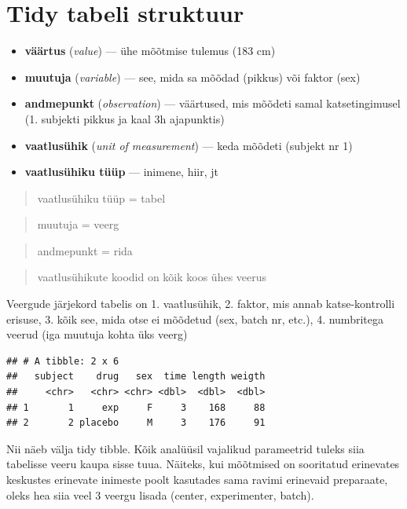 \documentclass[]{book}
\providecommand{\tightlist}{%
  \setlength{\itemsep}{0pt}\setlength{\parskip}{0pt}}
\begin{document}
\section{Tidy tabeli struktuur}\label{tidy-tabeli-struktuur}

\begin{itemize}
\tightlist
\item
  \textbf{väärtus} (\emph{value}) --- ühe mõõtmise tulemus (183 cm)
\item
  \textbf{muutuja} (\emph{variable}) --- see, mida sa mõõdad (pikkus)
  või faktor (sex)
\item
  \textbf{andmepunkt} (\emph{observation}) --- väärtused, mis mõõdeti
  samal katsetingimusel (1. subjekti pikkus ja kaal 3h ajapunktis)
\item
  \textbf{vaatlusühik} (\emph{unit of measurement}) --- keda mõõdeti
  (subjekt nr 1)
\item
  \textbf{vaatlusühiku tüüp} --- inimene, hiir, jt
\end{itemize}

\begin{quote}
vaatlusühiku tüüp = tabel
\end{quote}

\begin{quote}
muutuja = veerg
\end{quote}

\begin{quote}
andmepunkt = rida
\end{quote}

\begin{quote}
vaatlusühikute koodid on kõik koos ühes veerus
\end{quote}

Veergude järjekord tabelis on 1. vaatlusühik, 2. faktor, mis annab
katse-kontrolli erisuse, 3. kõik see, mida otse ei mõõdetud (sex, batch
nr, etc.), 4. numbritega veerud (iga muutuja kohta üks veerg)

\begin{verbatim}
## # A tibble: 2 x 6
##   subject    drug   sex  time length weigth
##     <chr>   <chr> <chr> <dbl>  <dbl>  <dbl>
## 1       1     exp     F     3    168     88
## 2       2 placebo     M     3    176     91
\end{verbatim}

Nii näeb välja tidy tibble. Kõik analüüsil vajalikud parameetrid tuleks
siia tabelisse veeru kaupa sisse tuua. Näiteks, kui mõõtmised on
sooritatud erinevates keskustes erinevate inimeste poolt kasutades sama
ravimi erinevaid preparaate, oleks hea siia veel 3 veergu lisada
(center, experimenter, batch).
\end{document}
